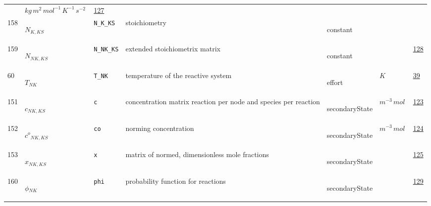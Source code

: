 \begin{longtable}{|p{1cm}|p{2.5cm}|p{4.5cm}|p{8cm}|p{3.0cm}|p{3cm}|p{1cm}|}
             & $ kg \,m^{2} \,mol^{-1} \,K^{-1} \,s^{-2} \, $
             & \hyperlink{"e:127"}{ 127 }
                 \\
    158
             & \hypertarget{"v:158"}{ $ {N}{_{K, {K S}}} $}
             & \verb|N_K_KS|
             & stoichiometry
             & \begin{lay}constant \end{lay}
             & $  $
             & \\
    159
             & \hypertarget{"v:159"}{ $ {N}{_{{N K}, {K S}}} $}
             & \verb|N_NK_KS|
             & extended stoichiometrix matrix
             & \begin{lay}constant \end{lay}
             & $  $
             & \hyperlink{"e:128"}{ 128 }
                 \\
    60
             & \hypertarget{"v:60"}{ $ {T}{_{{N K}}} $}
             & \verb|T_NK|
             & temperature of the reactive system
             & \begin{lay}effort \end{lay}
             & $ K \, $
             & \hyperlink{"e:39"}{ 39 }
                 \\
    151
             & \hypertarget{"v:151"}{ $ {c}{_{{N K}, {K S}}} $}
             & \verb|c|
             & concentration matrix reaction per node and species per reaction
             & \begin{lay}secondaryState \end{lay}
             & $ m^{-3} \,mol \, $
             & \hyperlink{"e:123"}{ 123 }
                 \\
    152
             & \hypertarget{"v:152"}{ $ {{c^o}}{_{{N K}, {K S}}} $}
             & \verb|co|
             & norming concentration
             & \begin{lay}secondaryState \end{lay}
             & $ m^{-3} \,mol \, $
             & \hyperlink{"e:124"}{ 124 }
                 \\
    153
             & \hypertarget{"v:153"}{ $ {x}{_{{N K}, {K S}}} $}
             & \verb|x|
             & matrix of normed, dimensionless mole fractions 
             & \begin{lay}secondaryState \end{lay}
             & $  $
             & \hyperlink{"e:125"}{ 125 }
                 \\
    160
             & \hypertarget{"v:160"}{ $ {\phi}{_{{N K}}} $}
             & \verb|phi|
             & probability function for reactions
             & \begin{lay}secondaryState \end{lay}
             & $  $
             & \hyperlink{"e:129"}{ 129 }
                 \\
    \end{longtable}